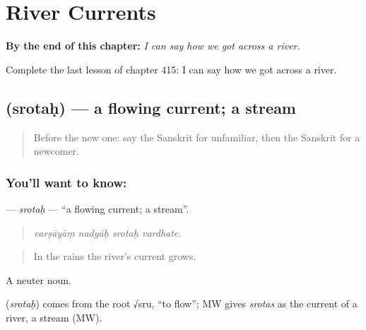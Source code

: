 
\chapter{River Currents}
\label{ch:sa-river-currents}

\begin{chapteropening}
\textbf{By the end of this chapter:} \emph{I can say how we got across a river.}

Complete the last lesson of chapter 415: I can say how we got across a river.
\end{chapteropening}

\section[\texorpdfstring{\sk{स्रोतः} (srotaḥ)}{स्रोतः (srotaḥ)}]{ (srotaḥ) — a flowing current; a stream}

\label{lesson:SA-C415-srotah}



\begin{quote}
Before the new one: say the Sanskrit for unfamiliar, then the Sanskrit for a newcomer.
\end{quote}

\subsection*{You'll want to know: }
\textbf{} — \emph{srotaḥ} — \textquotedblleft{}a flowing current; a stream\textquotedblright{}.

\begin{quote}
   
\end{quote}

\begin{quote}
\emph{varṣāyāṃ nadyāḥ srotaḥ vardhate.}
\end{quote}

\begin{quote}
In the rains the river's current grows.
\end{quote}

A neuter noun.

\begin{cousinweb}
\textbf{} (\emph{srotaḥ}) comes from the root √sru, \textquotedblleft{}to flow\textquotedblright{}; MW gives \emph{srotas} as the current of a river, a stream (MW).
\end{cousinweb}

